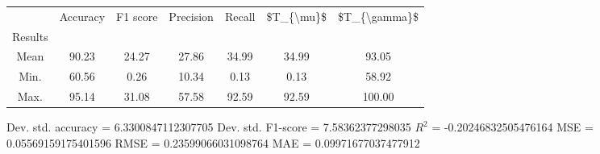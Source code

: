 \begin{tabular}{|c|c|c|c|c|c|c|}
\toprule
{} &  Accuracy &  F1 score &  Precision &  Recall &  \$T\_\{\textbackslash mu\}\$ &  \$T\_\{\textbackslash gamma\}\$ \\
Results &           &           &            &         &            &               \\
\hline
Mean    &     90.23 &     24.27 &      27.86 &   34.99 &      34.99 &         93.05 \\
Min.    &     60.56 &      0.26 &      10.34 &    0.13 &       0.13 &         58.92 \\
Max.    &     95.14 &     31.08 &      57.58 &   92.59 &      92.59 &        100.00 \\
\bottomrule
\end{tabular}

 Dev. std. accuracy = 6.3300847112307705
 Dev. std. F1-score = 7.58362377298035
 $R^2$ = -0.20246832505476164
 MSE = 0.05569159175401596
 RMSE = 0.23599066031098764
 MAE = 0.09971677037477912